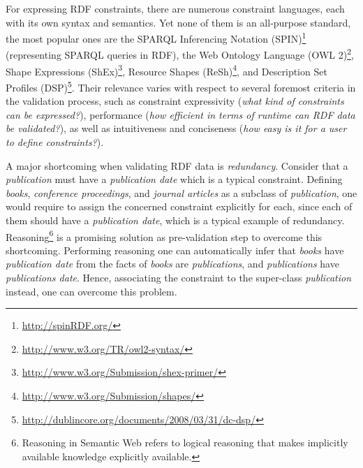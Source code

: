 \documentclass{llncs}
\begin{document}
For expressing RDF constraints, there are numerous constraint languages, each with its own syntax and semantics.  
Yet none of them is an all-purpose standard, the most popular ones are
the SPARQL Inferencing Notation (SPIN)\footnote{\url{http://spinRDF.org/}} (representing SPARQL queries in RDF), 
the Web Ontology Language (OWL 2)\footnote{\url{http://www.w3.org/TR/owl2-syntax/}}, 
Shape Expressions (ShEx)\footnote{\url{http://www.w3.org/Submission/shex-primer/}}, 
Resource Shapes (ReSh)\footnote{\url{http://www.w3.org/Submission/shapes/}}, 
and Description Set Profiles (DSP)\footnote{\url{http://dublincore.org/documents/2008/03/31/dc-dsp/}}.
Their relevance varies with respect to several foremost criteria in the validation process, such as constraint expressivity (\emph{what kind of constraints can be expressed?}), performance (\emph{how efficient in terms of runtime can RDF data be validated?}), as well as intuitiveness and conciseness (\emph{how easy is it for a user to define constraints?}). 






A major shortcoming when validating RDF data is \emph{redundancy}.
Consider that a \emph{publication} must have a \emph{publication date} which is a typical constraint.
Defining \emph{books}, \emph{conference proceedings}, and \emph{journal articles} as a subclass of \emph{publication}, one would require to assign the concerned constraint explicitly for each, since each of them should have a \emph{publication date}, which is a typical example of redundancy. Reasoning\footnote{Reasoning in Semantic Web refers to logical reasoning that  makes implicitly available knowledge explicitly available.} is a promising solution as pre-validation step to overcome this shortcoming. Performing reasoning one can automatically infer that \emph{books} have \emph{publication date} from the facts of \emph{books} are \emph{publications}, and \emph{publications} have \emph{publications date}.  Hence, associating the constraint to the super-class \emph{publication} instead, one can overcome this problem.
\end{document}
